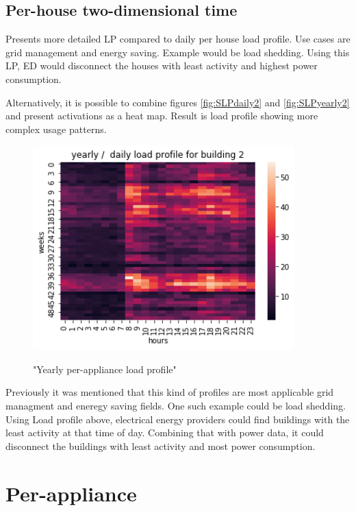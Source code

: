 \subsection{Per-house two-dimensional time}

Presents more detailed LP compared to daily per house load profile. Use cases are grid management and energy saving.
Example would be load shedding.
Using this LP, ED would disconnect the houses with least activity and highest power consumption. 

Alternatively, it is possible to combine figures \ref{fig:SLPdaily2} and \ref{fig:SLPyearly2} and present
activations as a heat map.
Result is load profile showing more complex usage patterns.

\begin{figure}[H]
	\centering
	\caption{"Yearly per-appliance load profile"}
	\includegraphics[width=0.9\textwidth]{../Figures/LPS/SLPHMyearly2.png}
	\label{fig:SLPHMyearly2}
\end{figure}

Previously it was mentioned that this kind of profiles are most applicable grid managment and eneregy saving fields. 
One such example could be load shedding.
Using Load profile above, electrical energy providers could find buildings with the least activity at that time of day.
Combining that with power data, it could disconnect the buildings with least activity and most power consumption.


\section{Per-appliance}

